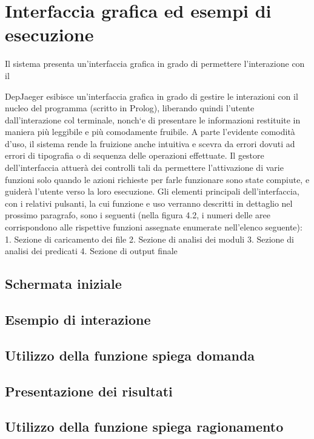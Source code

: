 \section{Interfaccia grafica ed esempi di esecuzione}

Il sistema presenta un'interfaccia grafica in grado di permettere l'interazione con il 


DepJaeger esibisce un’interfaccia grafica in grado di gestire le interazioni
con il nucleo del programma (scritto in Prolog), liberando quindi l’utente
dall’interazione col terminale, nonch`e di presentare le informazioni restituite
in maniera più leggibile e più comodamente fruibile. A parte l’evidente comodità d’uso, il sistema rende la fruizione anche intuitiva e scevra da errori dovuti ad errori di tipografia o di sequenza delle operazioni effettuate. Il gestore dell’interfaccia attuerà dei controlli tali da permettere l’attivazione di
varie funzioni solo quando le azioni richieste per farle funzionare sono state compiute, e guiderà l’utente verso la loro esecuzione. Gli elementi principali dell’interfaccia, con i relativi pulsanti, la cui funzione e uso verranno descritti in dettaglio nel prossimo paragrafo, sono i seguenti (nella figura 4.2, i numeri delle aree corrispondono alle rispettive funzioni assegnate enumerate
nell’elenco seguente):
1. Sezione di caricamento dei file
2. Sezione di analisi dei moduli
3. Sezione di analisi dei predicati
4. Sezione di output finale

\subsection{Schermata iniziale}

\subsection{Esempio di interazione}

\subsection{Utilizzo della funzione spiega domanda}

\subsection{Presentazione dei risultati}

\subsection{Utilizzo della funzione spiega ragionamento}